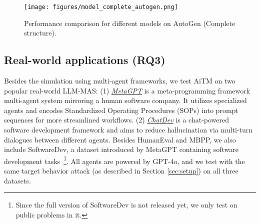 
\begin{figure}[h!]
    \centering
    \texttt{[image: figures/model\_complete\_autogen.png]}\vspace{-0.05in} 
    \caption{Performance comparison for different models on AutoGen (Complete structure).}
    \label{fig:models_autogen}
\end{figure}
\vspace{-0.1in}




\subsection{Real-world applications (RQ3)}

Besides the simulation using multi-agent frameworks, we test AiTM on two popular real-world LLM-MAS: (1) \underline{\textit{MetaGPT}} \citep{hong2023metagpt} is a meta-programming framework multi-agent system mirroring a human software company. It utilizes specialized agents and encodes Standardized Operating Procedures (SOPs) into prompt sequences for more
streamlined workflows. (2) \underline{\textit{ChatDev}} \citep{qian2024chatdev} is a chat-powered software development framework and aims to reduce hallucination via multi-turn dialogues between different agents. Besides HumanEval and MBPP, we also include SoftwareDev, a dataset introduced by MetaGPT containing software development tasks~\footnote{Since the full version of SoftwareDev is not released yet, we only test on public problems in it.}. All agents are powered by GPT-4o, and we test with the same target behavior attack (as described in Section \ref{sec:setup}) on all three datasets.

